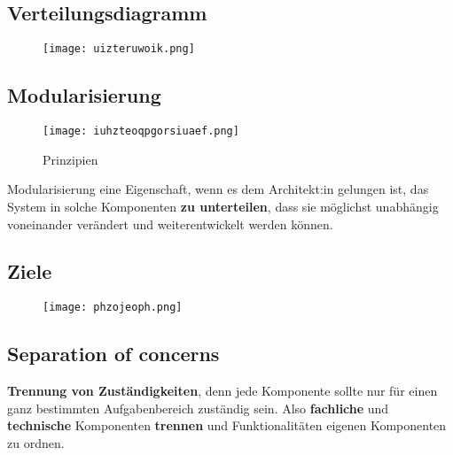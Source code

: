 \documentclass{book}
\begin{document}
    \subsection{Verteilungsdiagramm}
    \begin{figure} [H]
        \centering
        \texttt{[image: uizteruwoik.png]}
        \label{fig:enter-label}
    \end{figure}
    \subsection{Modularisierung}
    \begin{figure}[H]
        \centering
        \texttt{[image: iuhzteoqpgorsiuaef.png]}
        \caption{Prinzipien}
        \label{fig:enter-label}
    \end{figure}
    Modularisierung eine Eigenschaft, wenn es dem Architekt:in gelungen ist, das System in solche Komponenten\textbf{ zu unterteilen}, dass sie möglichst unabhängig voneinander verändert und weiterentwickelt werden können.
    \subsection{Ziele}
    \begin{figure} [h]
        \centering
        \texttt{[image: phzojeoph.png]}
        \label{fig:enter-label}
    \end{figure}
    \subsection{Separation of concerns}
    \textbf{Trennung von Zuständigkeiten}, denn jede Komponente sollte nur für einen ganz bestimmten Aufgabenbereich zuständig sein. Also \textbf{fachliche} und \textbf{technische} Komponenten\textbf{ trennen} und Funktionalitäten eigenen Komponenten zu ordnen.
\end{document}
